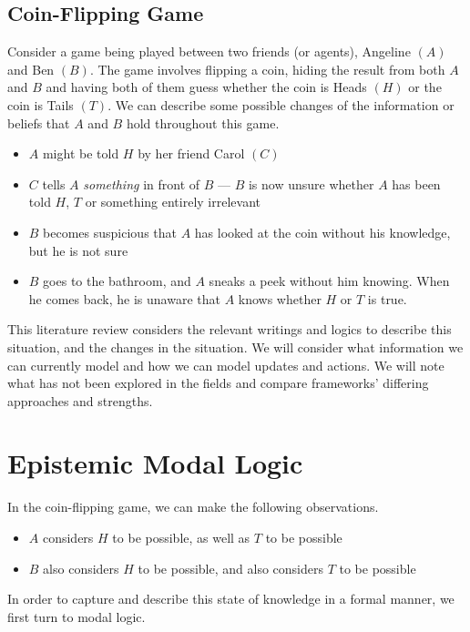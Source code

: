 \documentclass[12pt, a4paper, twoside]{article}
\begin{document}
\subsection{Coin-Flipping Game}\label{intro_coinFlipping}
Consider a game being played between two friends (or agents), Angeline $(A)$
and Ben $(B)$.
The game involves flipping a coin, hiding the result from both $A$ and $B$ and
having both of them guess whether the coin is Heads $(H)$ or the coin is Tails
$(T)$.
We can describe some possible changes of the information or beliefs that $A$ and
$B$ hold throughout this game.
\begin{itemize}
	\item $A$ might be told $H$ by her friend Carol $(C)$
	\item $C$ tells $A$ {\em something} in front of $B$ --- $B$ is now unsure
	whether $A$ has been told $H$, $T$ or something entirely irrelevant 
	\item $B$ becomes suspicious that $A$ has looked at the coin without his
	knowledge, but he is not sure
	\item $B$ goes to the bathroom, and $A$ sneaks a peek without him knowing.
	When he comes back, he is unaware that $A$ knows whether $H$ or $T$ is true.
\end{itemize}
This literature review considers the relevant writings and logics to describe
this situation, and the changes in the situation.
We will consider what information we can currently model and how we can model
updates and actions.
We will note what has not been explored in the fields and compare frameworks'
differing approaches and strengths.

\section{Epistemic Modal Logic}\label{epistemic}
In the coin-flipping game, we can make the following observations.
\begin{itemize}
	\item $A$ considers $H$ to be possible, as well as $T$ to be possible
	\item $B$ also considers $H$ to be possible, and also considers $T$ to be possible
\end{itemize}
In order to capture and describe this state of knowledge in a formal manner, we
first turn to modal logic.
\end{document}
